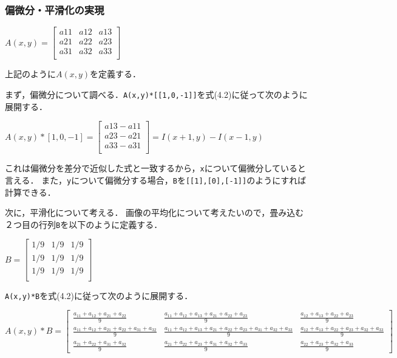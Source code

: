 \documentclass[autodetect-engine,dvi=dvipdfmx,ja=standard,
               a4j,11pt]{bxjsarticle}
\begin{document}
\subsubsection{偏微分・平滑化の実現}

$A(x,y)=\begin{bmatrix}
a11 & a12 & a13 \\
a21 & a22 & a23 \\
a31 & a32 & a33 \\
\end{bmatrix}$

上記のように$A(x,y)$を定義する．

まず，偏微分について調べる．\verb|A(x,y)*[[1,0,-1]]|を式(4.2)に従って次のように展開する．

$
A(x,y)*[1,0,-1]=\begin{bmatrix}
a13 - a11 \\
a23 - a21 \\
a33 - a31 \\
\end{bmatrix}
=I(x+1,y)-I(x-1,y)
$

これは偏微分を差分で近似した式と一致するから，\verb|x|について偏微分していると言える．
また，\verb|y|について偏微分する場合，\verb|B|を\verb|[[1],[0],[-1]]|のようにすれば計算できる．

次に，平滑化について考える．
画像の平均化について考えたいので，畳み込む２つ目の行列\verb|B|を以下のように定義する．

$B=\begin{bmatrix}
1/9 & 1/9 & 1/9 \\
1/9 & 1/9 & 1/9 \\
1/9 & 1/9 & 1/9 \\
\end{bmatrix}$

\verb|A(x,y)*B|を式(4.2)に従って次のように展開する．

$
A(x,y)*B=\begin{bmatrix}
\frac{a_{11} + a_{12} + a_{21} + a_{22}}{9} & \frac{a_{11} + a_{12} + a_{13} + a_{21} + a_{22} + a_{23}}{9} & \frac{a_{12} + a_{13} + a_{22} + a_{23}}{9} \\
\frac{a_{11} + a_{12} + a_{21} + a_{22} + a_{31} + a_{32}}{9} & \frac{a_{11} + a_{12} + a_{13} + a_{21} + a_{22} + a_{23} + a_{31} + a_{32} + a_{33}}{9} & \frac{a_{12} + a_{13} + a_{22} + a_{23} + a_{32} + a_{33}}{9} \\
\frac{a_{21} + a_{22} + a_{31} + a_{32}}{9} & \frac{a_{21} + a_{22} + a_{23} + a_{31} + a_{32} + a_{33}}{9} & \frac{a_{22} + a_{23} + a_{32} + a_{33}}{9}
\end{bmatrix}
$
\end{document}
